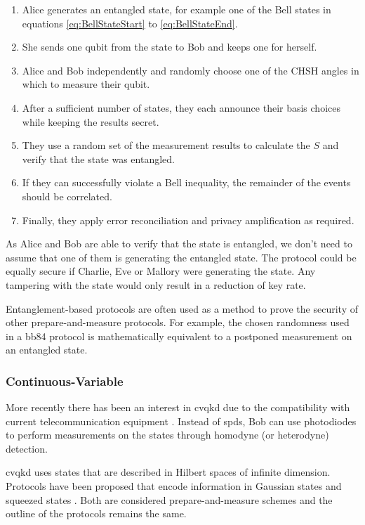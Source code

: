 \begin{algorithm}[Ekert 1991]
\begin{enumerate}
	\item Alice generates an entangled state, for example one of the Bell states in equations \ref{eq:BellStateStart} to \ref{eq:BellStateEnd}.
	\item She sends one qubit from the state to Bob and keeps one for herself.
	\item Alice and Bob independently and randomly choose one of the CHSH angles \cite{CHSH} in which to measure their qubit.
	\item After a sufficient number of states, they each announce their basis choices while keeping the results secret.
	\item They use a random set of the measurement results to calculate the $S$ and verify that the state was entangled.
	\item If they can successfully violate a Bell inequality, the remainder of the events should be correlated.
	\item Finally, they apply error reconciliation and privacy amplification as required.
\end{enumerate}
\end{algorithm}

As Alice and Bob are able to verify that the state is entangled, we don't need to assume that one of them is generating the entangled state. The protocol could be equally secure if Charlie, Eve or Mallory were generating the state. Any tampering with the state would only result in a reduction of key rate.

Entanglement-based protocols are often used as a method to prove the security of other prepare-and-measure protocols. For example, the chosen randomness used in a \ac{bb84} protocol is mathematically equivalent to a postponed measurement on an entangled state.

\subsubsection{Continuous-Variable}

More recently there has been an interest in \ac{cvqkd} due to the compatibility with current telecommunication equipment \cite{laudenbach2018continuous}. Instead of \acp{spd}, Bob can use photodiodes to perform measurements on the states through homodyne (or heterodyne) detection. 

\Ac{cvqkd} uses states that are described in Hilbert spaces of infinite dimension. Protocols have been proposed that encode information in Gaussian states \cite{Ralph1999} and squeezed states \cite{Hillery2000Quantum}. Both are considered prepare-and-measure schemes and the outline of the protocols remains the same.

